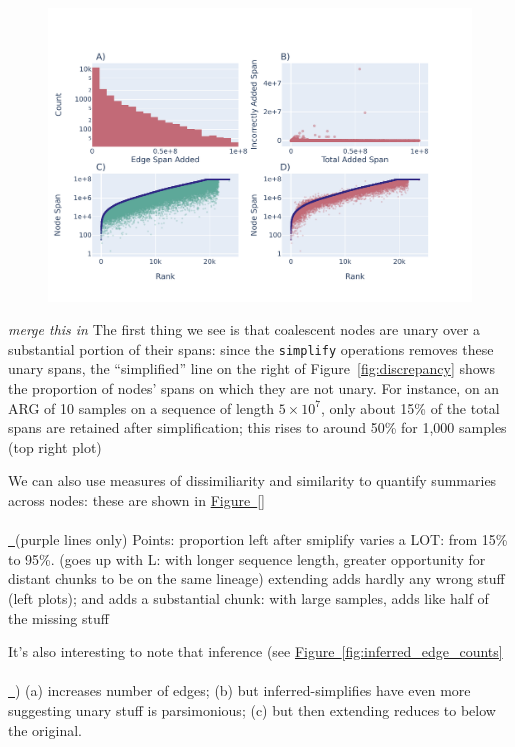 \documentclass[10pt,twoside,lineno]{gsajnl}
\newcommand{\comment}[1]{{\color{violet} \it #1}}
\newcommand*{\figref}[2][]{%
	\hyperref[{#2}]{%
		Figure~\ref*{#2}%
		\ifx\\#1\\%
		\else
		\,#1%
		\fi
	}%
}
\begin{document}
\begin{figure}
	\includegraphics{newplots_wo_ee/figure-4.pdf}
\end{figure}

\comment{merge this in}
The first thing we see is that coalescent nodes are unary
over a substantial portion of their spans:
since the \texttt{simplify} operations removes these unary spans,
the ``simplified'' line on the right of Figure~\ref{fig:discrepancy} shows
the proportion of nodes' spans on which they are not unary.
For instance, on an ARG of 10 samples on a sequence of length $5 \times 10^7$,
only about 15\% of the total spans are retained after simplification;
this rises to around 50\% for 1,000 samples (top right plot)

We can also use measures of dissimiliarity and similarity to quantify summaries across nodes:
these are shown in \figref{} (purple lines only)
Points:
proportion left after smiplify varies a LOT: from 15\% to 95\%.
    (goes up with L: with longer sequence length, greater opportunity for distant chunks to be on the same lineage)
extending adds hardly any wrong stuff (left plots); and adds a substantial chunk: with large samples, adds like half of the missing stuff

It's also interesting to  note that inference
(see \figref{fig:inferred_edge_counts})
(a) increases number of edges;
(b) but inferred-simplifies have even more suggesting unary stuff is parsimonious;
(c) but then extending reduces to below the original.
\end{document}
